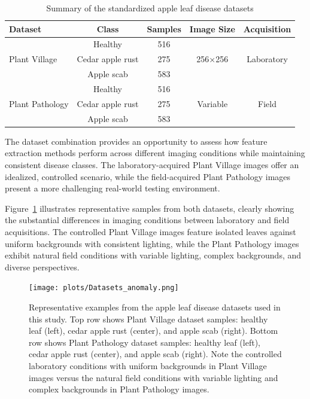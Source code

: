 \documentclass[12pt,a4paper,oneside]{report}
\begin{document}
\begin{table}[h]
\centering
\caption{Summary of the standardized apple leaf disease datasets}
\label{tab:datasets}
\begin{tabular}{lcccc}
\toprule
\textbf{Dataset} & \textbf{Class} & \textbf{Samples} & \textbf{Image Size} & \textbf{Acquisition} \\
\midrule
\multirow{3}{*}{Plant Village} & Healthy & 516 & \multirow{3}{*}{256×256} & \multirow{3}{*}{Laboratory} \\
 & Cedar apple rust & 275 & & \\
 & Apple scab & 583 & & \\
\midrule
\multirow{3}{*}{Plant Pathology} & Healthy & 516 & \multirow{3}{*}{Variable} & \multirow{3}{*}{Field} \\
 & Cedar apple rust & 275 & & \\
 & Apple scab & 583 & & \\
\bottomrule
\end{tabular}
\end{table}

The dataset combination provides an opportunity to assess how feature extraction methods perform across different imaging conditions while maintaining consistent disease classes. The laboratory-acquired Plant Village images offer an idealized, controlled scenario, while the field-acquired Plant Pathology images present a more challenging real-world testing environment.

Figure~\ref{fig:dataset_examples} illustrates representative samples from both datasets, clearly showing the substantial differences in imaging conditions between laboratory and field acquisitions. The controlled Plant Village images feature isolated leaves against uniform backgrounds with consistent lighting, while the Plant Pathology images exhibit natural field conditions with variable lighting, complex backgrounds, and diverse perspectives.

\newpage
\begin{landscape}
\begin{figure}[p]
    \centering
    \texttt{[image: plots/Datasets\_anomaly.png]}
    \caption{Representative examples from the apple leaf disease datasets used in this study. Top row shows Plant Village dataset samples: healthy leaf (left), cedar apple rust (center), and apple scab (right). Bottom row shows Plant Pathology dataset samples: healthy leaf (left), cedar apple rust (center), and apple scab (right). Note the controlled laboratory conditions with uniform backgrounds in Plant Village images versus the natural field conditions with variable lighting and complex backgrounds in Plant Pathology images.}
    \label{fig:dataset_examples}
\end{figure}
\end{landscape}
\newpage
\end{document}

